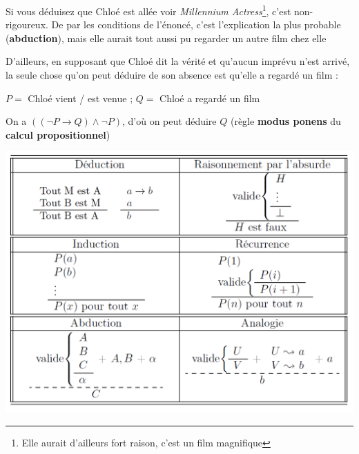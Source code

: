 \begin{frame}

Si vous déduisez que Chloé est allée voir \textit{Millennium Actress}\footnote{Elle aurait d'ailleurs fort raison, c'est un film magnifique}, c'est non-rigoureux. \pause De par les conditions de l'énoncé, c'est l'explication la plus probable (\textbf{abduction}), mais elle aurait tout aussi pu regarder un autre film chez elle\pause\newline

D'ailleurs, en supposant que Chloé dit la vérité et qu'aucun imprévu n'est arrivé, la seule chose qu'on peut déduire de son absence est qu'elle a regardé un film :\pause\newline

$P = $ Chloé vient / est venue ;  $Q = $ Chloé a regardé un film\newline\pause

On a $((\neg P \rightarrow Q) \wedge \neg P)$, d'où on peut déduire $Q$ (règle \textbf{modus ponens} du \textbf{calcul propositionnel})

\end{frame}


\begin{frame}

\includegraphics[scale=0.32]{raisonnements.png}

\end{frame}

